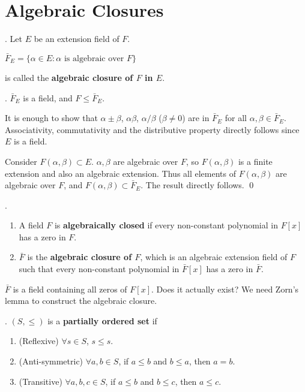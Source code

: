 \section*{Algebraic Closures}

.  Let \(E\) be an extension field of \(F\).
\begin{center}
    \(\bar{F}_E = \{\alpha \in E : \alpha \text{ is algebraic over } F\}\)
\end{center}
is called the \textbf{algebraic closure of \(F\) in \(E\)}.

\prop. \(\bar{F}_E\) is a field, and \(F \leq \bar{F}_E\).

\pf It is enough to show that \(\alpha \pm \beta\), \(\alpha \beta\), \(\alpha / \beta\) (\(\beta \neq 0\)) are in \(\bar{F}_E\) for all \(\alpha, \beta \in \bar{F}_E\). Associativity, commutativity and the distributive property directly follows since \(E\) is a field.

Consider \(F(\alpha, \beta) \subset E\). \(\alpha, \beta\) are algebraic over \(F\), so \(F(\alpha, \beta)\) is a finite extension and also an algebraic extension. Thus all elements of \(F(\alpha, \beta)\) are algebraic over \(F\), and \(F(\alpha, \beta) \subset \bar{F}_E\). The result directly follows. \qed

. 
\begin{enumerate}
    \item A field \(F\) is \textbf{algebraically closed} if every non-constant polynomial in \(F[x]\) has a zero in \(F\).
    \item \(\bar{F}\) is the \textbf{algebraic closure of \(F\)}, which is an algebraic extension field of \(F\) such that every non-constant polynomial in \(\bar{F}[x]\) has a zero in \(\bar{F}\).
\end{enumerate}

\(\bar{F}\) is a field containing all zeros of \(F[x]\). Does it actually exist? We need Zorn's lemma to construct the algebraic closure.

.  \((S, \leq)\) is a \textbf{partially ordered set} if
\begin{enumerate}
    \item (Reflexive) \(\forall s \in S\), \(s \leq s\).
    \item (Anti-symmetric) \(\forall a, b \in S\), if \(a \leq b\) and \(b \leq a\), then \(a = b\).
    \item (Transitive) \(\forall a, b, c \in S\), if \(a \leq b\) and \(b \leq c\), then \(a \leq c\).
\end{enumerate}

